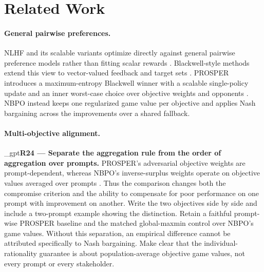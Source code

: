 \documentclass{article}
\newif\ifshowreviews
\newcommand{\reviewresponse}[1]{%
  \ifshowreviews
  \par\begingroup\color{blue!65!black}\hypersetup{allcolors=blue!65!black}\emergencystretch=2em%
  \noindent\textbf{Response:} #1\par\endgroup
  \fi}
\theoremstyle{remark}
\theoremstyle{plain}
\newcommand{\NBPO}{\textsc{NBPO}}
\begin{document}
\section{Related Work}
\label{sec:related}
\paragraph{General pairwise preferences.}
NLHF and its scalable variants optimize directly against general pairwise preference models rather than fitting scalar rewards \citep{munos2024nash,wu2025sppo,zhang2025iterative,calandriello2024online,rosset2024direct,zhou2025egpo}. Blackwell-style methods extend this view to vector-valued feedback and target sets \citep{blackwell1956analog,bhatia2020multicriteria}. PROSPER introduces a maximum-entropy Blackwell winner with a scalable single-policy update and an inner worst-case choice over objective weights and opponents \citep{zhang2026prosper}. \NBPO{} instead keeps one regularized game value per objective and applies Nash bargaining across the improvements over a shared fallback.

\paragraph{Multi-objective alignment.}

\kekim_gpt{\textbf{R24 --- Separate the aggregation rule from the order of aggregation over prompts.} PROSPER's adversarial objective weights are prompt-dependent, whereas NBPO's inverse-surplus weights operate on objective values averaged over prompts \citep{zhang2026prosper}. Thus the comparison changes both the compromise criterion and the ability to compensate for poor performance on one prompt with improvement on another. Write the two objectives side by side and include a two-prompt example showing the distinction. Retain a faithful prompt-wise PROSPER baseline and the matched global-maxmin control over NBPO's game values. Without this separation, an empirical difference cannot be attributed specifically to Nash bargaining. Make clear that the individual-rationality guarantee is about population-average objective game values, not every prompt or every stakeholder.}
\reviewresponse{\textbf{R24 --- Partially addressed.} Global Nash, matched global maxmin and prompt-wise PROSPER aggregation are distinguished, with the two-prompt example retained. PROSPER is labeled an adaptation, not a full reproduction. Its selected-policy negative prompt surpluses are not infeasibility certificates. Any checklist-based extension must preserve fixed semantic objective identities before applying NBPO's shared multipliers.}
\end{document}
